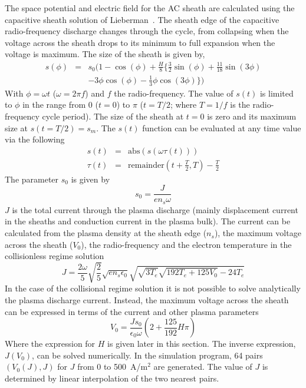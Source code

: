 The space potential and electric field for the AC sheath are calculated using the capacitive sheath solution of Lieberman~\cite{Lieberman1988,Lieberman1989}. The sheath edge of the capacitive radio-frequency discharge changes through the cycle, from collapsing when the voltage across the sheath drops to its minimum to full expansion when the voltage is maximum. The size of the sheath is given by, 
\begin{eqnarray}
s(\phi) &=& s_0 ( 1 - \cos(\phi) + \frac{H}{8} \{ \frac32 \sin(\phi)  + \frac{11}{18} \sin(3 \phi) \nonumber \\ 
        & & - 3 \phi \cos(\phi)  - \frac13 \phi \cos(3 \phi)  \} )
\end{eqnarray}
With $\phi = \omega t$ ($\omega = 2 \pi f$) and $f$ the radio-frequency. The value of $s(t)$ is limited to $\phi$ in the range from 0 ($t=0$) to $\pi$ ($t=T/2$; where $T=1/f$ is the radio-frequency cycle period). The size of the sheath at $t=0$ is zero and its maximum size at $s(t=T/2) = s_m$. The $s(t)$ function can be evaluated at any time value via the following 
\begin{eqnarray}
s(t)    &=& \text{abs}(s(\omega \tau(t))) \\
\tau(t) &=& \text{remainder}\left(t+\frac{T}{2},T\right) - \frac{T}{2} 
\end{eqnarray}
The parameter $s_0$ is given by 
\begin{equation}
s_0 = \frac{J}{e n_s \omega}
\end{equation}
$J$ is the total current through the plasma discharge (mainly displacement current in the sheaths and conduction current in the plasma bulk). The current can be calculated from the plasma density at the sheath edge ($n_s$), the maximum voltage across the sheath ($V_0$), the radio-frequency and the electron temperature in the collisionless regime solution~\cite{Lieberman1988}
\begin{equation}
J = \frac{2 \omega}{5} \sqrt{\frac25} \sqrt{e n_s \epsilon_0} \sqrt{ \sqrt{3 T_e} \sqrt{192 T_e + 125 V_0} -24 T_e    }
\end{equation}
In the case of the collisional regime solution it is not possible to solve analytically the plasma discharge current. Instead, the maximum voltage across the sheath can be expressed in terms of the current and other plasma parameters ~\cite{Lieberman1989}
\begin{equation}
V_0 = \frac{J s_0}{\epsilon_0 \omega} \left(  2 + \frac{125}{192} H \pi \right)
\end{equation}
Where the expression for $H$ is given later in this section. The inverse expression, $J(V_0)$, can be solved numerically. In the simulation program, 64 pairs $(V_0(J),J)$ for $J$ from 0 to 500~A/m$^2$ are generated. The value of $J$ is determined by linear interpolation of the two nearest pairs.
 
